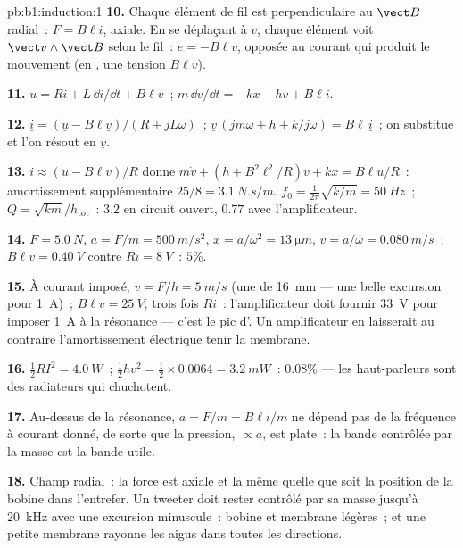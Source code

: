 \begin{solution}{pb:b1:induction:1}
\textbf{10.} Chaque élément de fil est perpendiculaire au $\vect B$ radial~:
$F = B\ell i$, axiale. En se déplaçant à $v$, chaque élément voit $\vect v\wedge\vect B$
selon le fil~: $e = -B\ell v$, opposée au courant qui produit le
mouvement (en , une tension $B\ell v$).

\textbf{11.} $u = Ri + L\,\dd i/\dd t + B\ell v$~; $m\,\dd v/\dd t = -kx - hv + B\ell i$.

\textbf{12.} $\underline i = (\underline u - B\ell\underline v)/(R + jL\omega)$~; $\underline v\,(jm\omega + h +
k/j\omega) = B\ell\,\underline i$~; on substitue et l'on résout en $\underline v$.

\textbf{13.} $i \approx (u - B\ell v)/R$ donne $m\dot v + (h + B^2\ell^2/R)v + kx =
B\ell u/R$~: amortissement supplémentaire $25/8 = \qty{3.1}{N.s/m}$. $f_0 = \tfrac1{2\pi}\sqrt{k/m} =
\qty{50}{Hz}$~; $Q = \sqrt{km}/h_{\text{tot}}$~: $3.2$ en circuit ouvert, $0.77$ avec
l'amplificateur.

\textbf{14.} $F = \qty{5.0}{N}$, $a = F/m = \qty{500}{m/s^2}$, $x = a/\omega^2 =
\qty{13}{\micro m}$, $v = a/\omega = \qty{0.080}{m/s}$~; $B\ell v = \qty{0.40}{V}$ contre
$Ri = \qty{8}{V}$~: $5\%$.

\textbf{15.} À courant imposé, $v = F/h = \qty{5}{m/s}$ (une  de
\qty{16}{mm} --- une belle excursion pour \qty{1}{A})~; $B\ell v =
\qty{25}{V}$, trois fois $Ri$~: l'amplificateur doit fournir \qty{33}{V} pour
imposer \qty{1}{A} à la résonance --- c'est le pic d'. Un amplificateur
en  laisserait au contraire l'amortissement électrique tenir la membrane.

\textbf{16.} $\tfrac12RI^2 = \qty{4.0}{W}$~; $\tfrac12hv^2 = \tfrac12 \times 0.0064 =
\qty{3.2}{mW}$~:  $0.08\%$ --- les haut-parleurs sont des radiateurs
qui chuchotent.

\textbf{17.} Au-dessus de la résonance, $a = F/m = B\ell i/m$ ne dépend pas de
la fréquence à courant donné, de sorte que la pression, $\propto a$, est plate~:
la bande contrôlée par la masse est la bande utile.

\textbf{18.} Champ radial~: la force est axiale et la même quelle que soit la
position de la bobine dans l'entrefer. Un tweeter doit rester contrôlé par sa
masse jusqu'à \qty{20}{kHz} avec une excursion minuscule~: bobine et membrane
légères~; et une petite membrane rayonne les aigus dans toutes les directions.


\end{solution}
